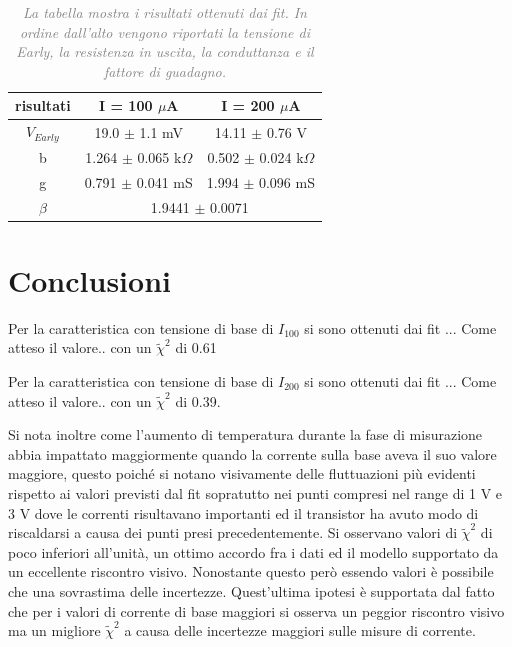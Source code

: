 \documentclass[a4paper,11pt]{article}
\begin{document}
\begin{table}[htbp] %
\begin{center}
\begin{tabular}{ |c|c|c| }
\hline
risultati & I = 100 $\mu$A & I = 200 $\mu$A \\ 
\hline
$V_{Early}$ & 19.0 $\pm$ 1.1 mV & 14.11 $\pm$ 0.76 V \\  
\hline
b & 1.264 $\pm$ 0.065 k$\Omega$ & 0.502 $\pm$ 0.024 k$\Omega$ \\
\hline
g & 0.791 $\pm$ 0.041 mS & 1.994 $\pm$ 0.096 mS \\
\hline
$\beta$ & \multicolumn{2}{|c|}{1.9441 $\pm$ 0.0071} \\
\hline
\end{tabular}
\caption{\textit{\textcolor{gray}{La tabella mostra i risultati ottenuti dai fit. In ordine dall'alto vengono riportati la tensione di Early, la resistenza in uscita, la conduttanza e il fattore di guadagno.}}}
\label{tab::risultati}
\end{center}
\end{table}



\section{Conclusioni}
Per la caratteristica con tensione di base di $I_{100}$ si sono ottenuti dai fit ... Come atteso il valore..
con un $\tilde\chi^2$ di 0.61

Per la caratteristica con tensione di base di $I_{200}$ si sono ottenuti dai fit ... Come atteso il valore..
con un $\tilde\chi^2$ di 0.39.

Si nota inoltre come l'aumento di temperatura durante la fase di misurazione abbia impattato maggiormente quando la corrente sulla base aveva il suo valore maggiore, questo poiché si notano visivamente delle fluttuazioni più evidenti rispetto ai valori previsti dal fit sopratutto nei punti compresi nel range di 1 V e 3 V dove le correnti risultavano importanti ed il transistor ha avuto modo di riscaldarsi a causa dei punti presi precedentemente.
Si osservano  valori di $\tilde\chi^2$ di poco inferiori all'unità, un ottimo accordo fra i dati ed il modello supportato da un eccellente riscontro visivo. Nonostante questo però essendo valori è possibile che una sovrastima delle incertezze. Quest'ultima ipotesi è supportata dal fatto che per i valori di corrente di base maggiori si osserva un peggior riscontro visivo ma un migliore $\tilde\chi^2$ a causa delle incertezze maggiori sulle misure di corrente.
\end{document}
